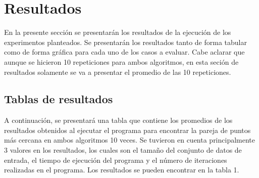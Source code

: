 \section{Resultados}
En la presente sección se presentarán los resultados de la ejecución de los experimentos planteados. Se presentarán los resultados tanto de forma tabular como de forma gráfica para cada uno de los casos a evaluar. Cabe aclarar que aunque se hicieron 10 repeticiones para ambos algoritmos, en esta seción de resultados solamente se va a presentar el promedio de las 10 repeticiones. \\

\subsection{Tablas de resultados}
A continuación, se presentará una tabla que contiene los promedios de los resultados obtenidos al ejecutar el programa para encontrar la pareja de puntos más cercana en ambos algoritmos 10 veces. Se tuvieron en cuenta principalmente 3 valores en los resultados, los cuales son el tamaño del conjunto de datos de entrada, el tiempo de ejecución del programa y el número de iteraciones realizadas en el programa. Los resultados se pueden encontrar en la tabla 1.\\

